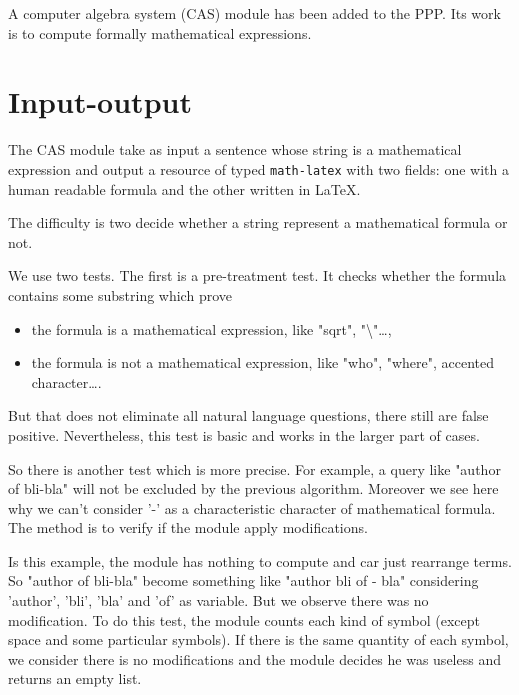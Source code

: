 \newcommand{\CalChAS}{\text{C}\hspace{-2pt}_{\text{AL}}\hspace{-3pt}\text{C}^{\text{H}}{\hspace{-4pt}}_\text{AS}}
\newcommand{\RR}{\mathbb{R}}
\newcommand{\CC}{\mathbb{C}}
\newcommand{\ZZ}{\mathbb{Z}}
\newcommand{\NN}{\mathbb{N}}

A computer algebra system (CAS) module has been added to the PPP. Its work is to compute formally mathematical expressions.

\section{Input-output}

The CAS module take as input a sentence whose string is a mathematical expression and output a resource of typed \texttt{math-latex} with two fields: one with a human readable formula and the other written in \LaTeX.

The difficulty is two decide whether a string represent a mathematical formula or not.

We use two tests. The first is a pre-treatment test. It checks whether the formula contains some substring which prove
\begin{itemize}
    \item the formula is a mathematical expression, like "sqrt", "\textbackslash"\ldots,
    \item the formula is not a mathematical expression, like "who", "where", accented character\ldots.
\end{itemize}

But that does not eliminate all natural language questions, there still are false positive. Nevertheless, this test is basic and works in the larger part of cases.

\bigskip

So there is another test which is more precise. For example, a query like "author of bli-bla" will not be excluded by the previous algorithm. Moreover we see here why we can't consider '-' as a characteristic character of mathematical formula. The method is to verify if the module apply modifications.

Is this example, the module has nothing to compute and car just rearrange terms. So "author of bli-bla" become something like "author bli of - bla" considering 'author', 'bli', 'bla' and 'of' as variable. But we observe there was no modification. To do this test, the module counts each kind of symbol (except space and some particular symbols). If there is the same quantity of each symbol, we consider there is no modifications and the module decides he was useless and returns an empty list.

